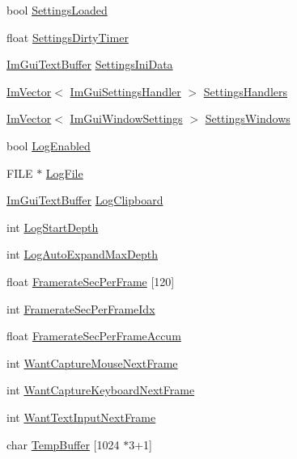 \begin{DoxyCompactItemize}
\item 
bool \mbox{\hyperlink{struct_im_gui_context_a1043af3ac30119c12c2e85923e1ec20b}{Settings\+Loaded}}
\item 
float \mbox{\hyperlink{struct_im_gui_context_a7e0dd3aef4a4f0fd85ed39e13824f2ab}{Settings\+Dirty\+Timer}}
\item 
\mbox{\hyperlink{struct_im_gui_text_buffer}{Im\+Gui\+Text\+Buffer}} \mbox{\hyperlink{struct_im_gui_context_a5b4bad72af7065aa7e57b32fedd5ea0e}{Settings\+Ini\+Data}}
\item 
\mbox{\hyperlink{class_im_vector}{Im\+Vector}}$<$ \mbox{\hyperlink{struct_im_gui_settings_handler}{Im\+Gui\+Settings\+Handler}} $>$ \mbox{\hyperlink{struct_im_gui_context_aded9a2cb80c805407734b8bf7d0ef515}{Settings\+Handlers}}
\item 
\mbox{\hyperlink{class_im_vector}{Im\+Vector}}$<$ \mbox{\hyperlink{struct_im_gui_window_settings}{Im\+Gui\+Window\+Settings}} $>$ \mbox{\hyperlink{struct_im_gui_context_a19273d7eb5a729463c042671ae27ca58}{Settings\+Windows}}
\item 
bool \mbox{\hyperlink{struct_im_gui_context_a2508bec1862aa4477eca2c79d6924b82}{Log\+Enabled}}
\item 
F\+I\+LE $\ast$ \mbox{\hyperlink{struct_im_gui_context_a73a73a599720fb933e4fb5e673dde131}{Log\+File}}
\item 
\mbox{\hyperlink{struct_im_gui_text_buffer}{Im\+Gui\+Text\+Buffer}} \mbox{\hyperlink{struct_im_gui_context_aa3db2d2e4129e125e5afc5a26d6234c9}{Log\+Clipboard}}
\item 
int \mbox{\hyperlink{struct_im_gui_context_a6ac157821b3a0eb9d0411bc477df8665}{Log\+Start\+Depth}}
\item 
int \mbox{\hyperlink{struct_im_gui_context_a153d8c6eee2acdd3676ca55aec7b1079}{Log\+Auto\+Expand\+Max\+Depth}}
\item 
float \mbox{\hyperlink{struct_im_gui_context_aca772ab262c0094e8bbe7eae215fc23b}{Framerate\+Sec\+Per\+Frame}} \mbox{[}120\mbox{]}
\item 
int \mbox{\hyperlink{struct_im_gui_context_a64a96ad72dd7009dba134f6214a4936e}{Framerate\+Sec\+Per\+Frame\+Idx}}
\item 
float \mbox{\hyperlink{struct_im_gui_context_abcd18f2f8fedf0f45c3148b3e956e653}{Framerate\+Sec\+Per\+Frame\+Accum}}
\item 
int \mbox{\hyperlink{struct_im_gui_context_a7e7a9bbeaac9519abe29818ce6c2cc3b}{Want\+Capture\+Mouse\+Next\+Frame}}
\item 
int \mbox{\hyperlink{struct_im_gui_context_a0372056c72eac8b3e6de06c404caa5b3}{Want\+Capture\+Keyboard\+Next\+Frame}}
\item 
int \mbox{\hyperlink{struct_im_gui_context_abe551d35ea5c1aa61a4d5c785c8e0d9d}{Want\+Text\+Input\+Next\+Frame}}
\item 
char \mbox{\hyperlink{struct_im_gui_context_a875033fc5c10bc1e050f8701055ae93b}{Temp\+Buffer}} \mbox{[}1024 $\ast$3+1\mbox{]}
\end{DoxyCompactItemize}


